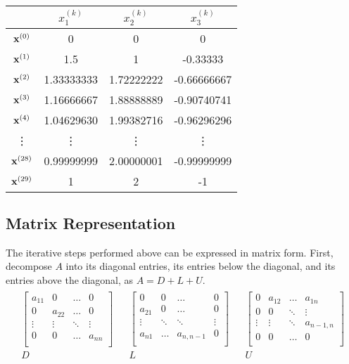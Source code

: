 \begin{center}
\begin{tabular}{c|ccc}
    & $x^{(k)}_1$ & $x^{(k)}_2$ & $x^{(k)}_3$ \\
    \hline
    $\mathbf{x}^{(0)}$ & 0 & 0 & 0 \\
    $\mathbf{x}^{(1)}$ & 1.5 & 1 & -0.33333 \\
    $\mathbf{x}^{(2)}$  & 1.33333333 & 1.72222222 & -0.66666667 \\
    $\mathbf{x}^{(3)}$  & 1.16666667 & 1.88888889 & -0.90740741 \\
    $\mathbf{x}^{(4)}$  & 1.04629630 & 1.99382716 & -0.96296296 \\
    \vdots      & \vdots     & \vdots     & \vdots      \\
    $\mathbf{x}^{(28)}$ & 0.99999999 & 2.00000001 & -0.99999999 \\
    $\mathbf{x}^{(29)}$ & 1          & 2          & -1          \\
\end{tabular}
\end{center}

\subsection*{Matrix Representation} %

The iterative steps performed above can be expressed in matrix form.
First, decompose $A$ into its diagonal entries, its entries below the diagonal, and its entries above the diagonal, as $A = D + L + U$.
\begin{align*}
\begin{array}{ccccc}
    \left[\begin{array}{cccc}
        a_{11} & 0 & \ldots & 0 \\
        0 & a_{22} & \ldots & 0 \\
        \vdots & \vdots & \ddots & \vdots \\
        0 & 0 & \ldots & a_{nn} \\
    \end{array}\right]
    & &
    \left[\begin{array}{cccc}
    0 & 0 & \ldots & 0 \\
    a_{21} &  0 & \ldots & 0\\
     \vdots & \ddots & \ddots & \vdots \\
    a_{n1} & \ldots & a_{n,n-1} & 0 \\
    \end{array}\right]
    & &
    \left[\begin{array}{cccc}
    0 & a_{12} & \ldots & a_{1n} \\
    0 & 0 & \ddots & \vdots \\
     \vdots & \vdots & \ddots & a_{n-1,n} \\
    0 & 0 & \ldots & 0 \\
    \end{array}\right]
    \\D & & L & & U
\end{array}
\end{align*}

